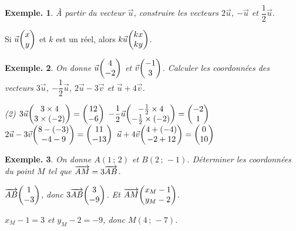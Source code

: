 \documentclass[12pt]{article}
\theoremstyle{break}
\newtheorem*{example}{Exemple.}
\begin{document}
\begin{example}
  À partir du vecteur $\vec u$, construire les vecteurs $2\vec u$, $-\vec u$ et $\dfrac{1}{2}\vec u$.

  \begin{center}
  \end{center}
\end{example}

\begin{proposition}{}{}
  \begin{multihide}
    Si $\vec u\col{x}{y}$ et $k$ est un réel, alors $k\vec u\col{kx}{ky}$.
  \end{multihide}
\end{proposition}

\begin{example}
  On donne $\vec u\col{4}{-2}$ et $\vec v\col{-1}{3}$. Calculer les coordonnées des vecteurs $3\vec u$, $-\dfrac{1}{2}\vec u$, $2\vec u - 3\vec v$ et $\vec u + 4\vec v$.
  \begin{reponse}
    \begin{tasks}[label=\textbullet](2)
      \task $3\vec u\col{3 \times 4}{3 \times (-2)} = \col{12}{-6}$
      \task $-\dfrac{1}{2}\vec u\col{-\frac{1}{2} \times 4}{-\frac{1}{2} \times (-2)} = \col{-2}{1}$
      \task $2\vec u - 3\vec v\col{8 - (-3)}{-4 - 9} = \col{11}{-13}$
      \task $\vec u + 4\vec v\col{4 + (-4)}{-2 + 12} = \col{0}{10}$
    \end{tasks}
  \end{reponse}
\end{example}

\begin{example}
  On donne $A(1\,;\,2)$ et $B(2\,;\,-1)$. Déterminer les coordonnées du point $M$ tel que $\overrightarrow{AM} = 3\overrightarrow{AB}$.
  \begin{reponse}
    $\wvec{AB}\col{1}{-3}$, donc $3\wvec{AB}\col{3}{-9}$. Et $\wvec{AM}\col{x_M - 1}{y_M - 2}$.

    $x_M - 1 = 3$ et $y_M - 2 = -9$, donc $M(4\,;\,-7)$.
  \end{reponse}
\end{example}
\end{document}
